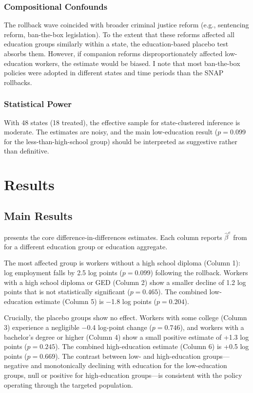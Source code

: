 \documentclass[12pt]{article}
\begin{document}
\subsubsection*{Compositional Confounds} The rollback wave coincided with broader criminal justice reform (e.g., sentencing reform, ban-the-box legislation). To the extent that these reforms affected all education groups similarly within a state, the education-based placebo test absorbs them. However, if companion reforms disproportionately affected low-education workers, the estimate would be biased. I note that most ban-the-box policies were adopted in different states and time periods than the SNAP rollbacks.

\subsubsection*{Statistical Power} With 48 states (18 treated), the effective sample for state-clustered inference is moderate. The estimates are noisy, and the main low-education result ($p = 0.099$ for the less-than-high-school group) should be interpreted as suggestive rather than definitive.

\section{Results}

\subsection{Main Results}

 presents the core difference-in-differences estimates. Each column reports $\hat{\beta}^{e}$ from  for a different education group or education aggregate.



The most affected group is workers without a high school diploma (Column 1): log employment falls by 2.5 log points ($p = 0.099$) following the rollback. Workers with a high school diploma or GED (Column 2) show a smaller decline of 1.2 log points that is not statistically significant ($p = 0.465$). The combined low-education estimate (Column 5) is $-$1.8 log points ($p = 0.204$).

Crucially, the placebo groups show no effect. Workers with some college (Column 3) experience a negligible $-$0.4 log-point change ($p = 0.746$), and workers with a bachelor's degree or higher (Column 4) show a small positive estimate of +1.3 log points ($p = 0.245$). The combined high-education estimate (Column 6) is +0.5 log points ($p = 0.669$). The contrast between low- and high-education groups---negative and monotonically declining with education for the low-education groups, null or positive for high-education groups---is consistent with the policy operating through the targeted population.
\end{document}
